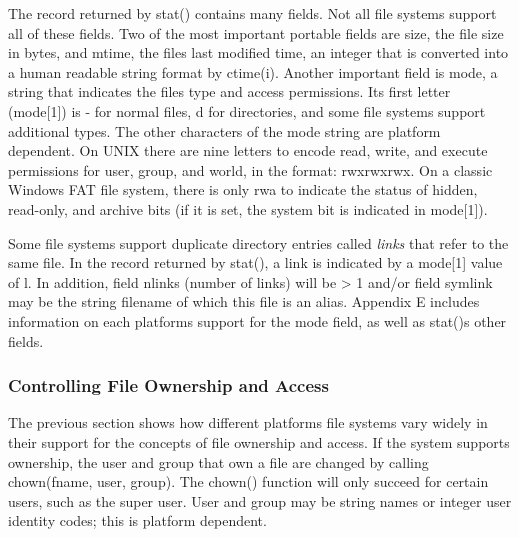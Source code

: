 The record returned by \textsf{stat()} contains many fields. Not all
file systems support all of these fields. Two of the most important
portable fields are \textsf{size}, the file size in
bytes, and \textsf{mtime}, the file{\textquotesingle}s last
modified time, an integer that is converted
into a human readable string format by \textsf{ctime(i)}. Another
important field is \textsf{mode}, a string that indicates the
file{\textquotesingle}s type and access
permissions. Its first letter (\textsf{mode[1]}) is
\textsf{{\textquotedbl}-{\textquotedbl}} for normal files,
\textsf{{\textquotedbl}d{\textquotedbl}} for directories, and some file
systems support additional types. The other characters of the mode
string are platform dependent. On UNIX there are nine letters to encode
read, write, and execute permissions for user, group, and world, in the
format: \textsf{{\textquotedbl}rwxrwxrwx{\textquotedbl}}. On a classic
Windows FAT file system, there is only
\textsf{{\textquotedbl}rwa{\textquotedbl}} to indicate the status of
hidden, read-only, and archive bits (if it is set, the system bit is
indicated in \textsf{mode[1]}).

Some file systems support duplicate directory entries called
\textit{links} that refer to the same file. In the record returned by
\textsf{stat()}, a link is indicated by a
\textsf{mode[1]} value of \textsf{{\textquotedbl}l{\textquotedbl}}. In
addition, field \textsf{nlinks} ({\textquotedbl}number of
links{\textquotedbl}) will be \textsf{{\textgreater} 1} and/or field
\textsf{symlink} may be the string filename of which this file is an
alias. Appendix E includes information on each
platform{\textquotesingle}s support for the \textsf{mode} field, as
well as \textsf{stat()}{\textquotesingle}s other fields.

\subsubsection[Controlling File Ownership and Access]{Controlling File
Ownership and Access}

The previous section shows how different
platforms{\textquotesingle} file systems vary widely in their support
for the concepts of file ownership and access. If the system supports
ownership, the user and group that own a file are changed by calling
\textsf{chown(fname, user, group)}. The \textsf{chown()}
function will only succeed for certain users, such as the super user.
User and group may be string names or integer user identity codes; this
is platform dependent.

